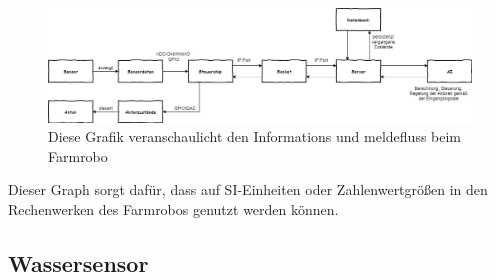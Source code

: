 \documentclass[]{article}
\begin{document}
	\begin{figure}[H]
	\centering
	\includegraphics[width=1\textwidth]{Datenflussdiagramm.png}
	\caption{Diese Grafik veranschaulicht den Informations und meldefluss beim Farmrobo}
	\label{img:grafik-dummy}
	\end{figure}
	
Dieser Graph sorgt dafür, dass auf SI-Einheiten oder Zahlenwertgrößen in den Rechenwerken des Farmrobos genutzt werden können.



\subsection{Wassersensor}
\end{document}
